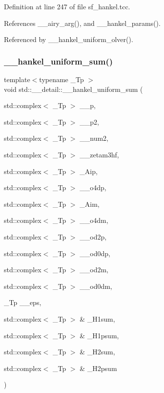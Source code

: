 Definition at line 247 of file sf\+\_\+hankel.\+tcc.



References \+\_\+\+\_\+airy\+\_\+arg(), and \+\_\+\+\_\+hankel\+\_\+params().



Referenced by \+\_\+\+\_\+hankel\+\_\+uniform\+\_\+olver().

\mbox{\label{namespacestd_1_1____detail_a561dc02bc44b2dba376d6047289563c7}} 
\subsubsection{\texorpdfstring{\+\_\+\+\_\+hankel\+\_\+uniform\+\_\+sum()}{\_\_hankel\_uniform\_sum()}}
{\footnotesize\ttfamily template$<$typename \+\_\+\+Tp $>$ \\
void std\+::\+\_\+\+\_\+detail\+::\+\_\+\+\_\+hankel\+\_\+uniform\+\_\+sum (\begin{DoxyParamCaption}\item[{std\+::complex$<$ \+\_\+\+Tp $>$}]{\+\_\+\+\_\+p,  }\item[{std\+::complex$<$ \+\_\+\+Tp $>$}]{\+\_\+\+\_\+p2,  }\item[{std\+::complex$<$ \+\_\+\+Tp $>$}]{\+\_\+\+\_\+num2,  }\item[{std\+::complex$<$ \+\_\+\+Tp $>$}]{\+\_\+\+\_\+zetam3hf,  }\item[{std\+::complex$<$ \+\_\+\+Tp $>$}]{\+\_\+\+Aip,  }\item[{std\+::complex$<$ \+\_\+\+Tp $>$}]{\+\_\+\+\_\+o4dp,  }\item[{std\+::complex$<$ \+\_\+\+Tp $>$}]{\+\_\+\+Aim,  }\item[{std\+::complex$<$ \+\_\+\+Tp $>$}]{\+\_\+\+\_\+o4dm,  }\item[{std\+::complex$<$ \+\_\+\+Tp $>$}]{\+\_\+\+\_\+od2p,  }\item[{std\+::complex$<$ \+\_\+\+Tp $>$}]{\+\_\+\+\_\+od0dp,  }\item[{std\+::complex$<$ \+\_\+\+Tp $>$}]{\+\_\+\+\_\+od2m,  }\item[{std\+::complex$<$ \+\_\+\+Tp $>$}]{\+\_\+\+\_\+od0dm,  }\item[{\+\_\+\+Tp}]{\+\_\+\+\_\+eps,  }\item[{std\+::complex$<$ \+\_\+\+Tp $>$ \&}]{\+\_\+\+H1sum,  }\item[{std\+::complex$<$ \+\_\+\+Tp $>$ \&}]{\+\_\+\+H1psum,  }\item[{std\+::complex$<$ \+\_\+\+Tp $>$ \&}]{\+\_\+\+H2sum,  }\item[{std\+::complex$<$ \+\_\+\+Tp $>$ \&}]{\+\_\+\+H2psum }\end{DoxyParamCaption})}



